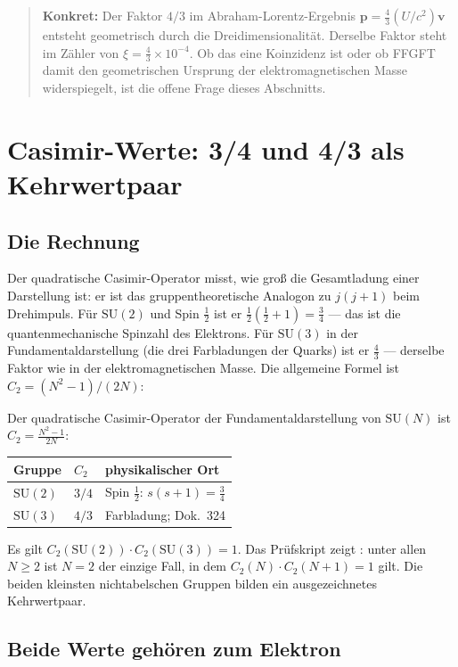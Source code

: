 \begin{quote}
\textbf{Konkret:} Der Faktor $4/3$ im Abraham-Lorentz-Ergebnis
$\mathbf p = \tfrac{4}{3}(U/c^2)\mathbf v$ entsteht geometrisch durch die
Dreidimensionalität. Derselbe Faktor steht im Zähler von $\xi = \tfrac{4}{3}\times10^{-4}$.
Ob das eine Koinzidenz ist oder ob FFGFT damit den geometrischen Ursprung der
elektromagnetischen Masse widerspiegelt, ist die offene Frage dieses Abschnitts.
\end{quote}

\section{Casimir-Werte: 3/4 und 4/3 als Kehrwertpaar}
\label{sec:casimir}

\subsection{Die Rechnung \EM}

Der quadratische Casimir-Operator misst, wie groß die Gesamtladung einer
Darstellung ist: er ist das gruppentheoretische Analogon zu $j(j+1)$ beim
Drehimpuls. Für $\mathrm{SU}(2)$ und Spin $\tfrac{1}{2}$ ist er
$\tfrac{1}{2}(\tfrac{1}{2}+1) = \tfrac{3}{4}$ --- das ist die quantenmechanische
Spinzahl des Elektrons. Für $\mathrm{SU}(3)$ in der Fundamentaldarstellung
(die drei Farbladungen der Quarks) ist er $\tfrac{4}{3}$ --- derselbe Faktor
wie in der elektromagnetischen Masse. Die allgemeine Formel ist
$C_2 = (N^2-1)/(2N)$:

Der quadratische Casimir-Operator der Fundamentaldarstellung von $\mathrm{SU}(N)$
ist $C_2 = \tfrac{N^2-1}{2N}$:
\begin{center}
\begin{tabular}{@{}lll@{}}
\toprule
Gruppe & $C_2$ & physikalischer Ort \\
\midrule
$\mathrm{SU}(2)$ & $3/4$ & Spin $\tfrac12$: $s(s+1) = \tfrac34$ \\
$\mathrm{SU}(3)$ & $4/3$ & Farbladung; Dok.~324 \\
\bottomrule
\end{tabular}
\end{center}
Es gilt $C_2(\mathrm{SU}(2))\cdot C_2(\mathrm{SU}(3)) = 1$. Das Prüfskript
zeigt \BM: unter allen $N\ge2$ ist $N=2$ der einzige Fall, in dem
$C_2(N)\cdot C_2(N{+}1)=1$ gilt. Die beiden kleinsten nichtabelschen Gruppen
bilden ein ausgezeichnetes Kehrwertpaar.

\subsection{Beide Werte gehören zum Elektron \SM}

